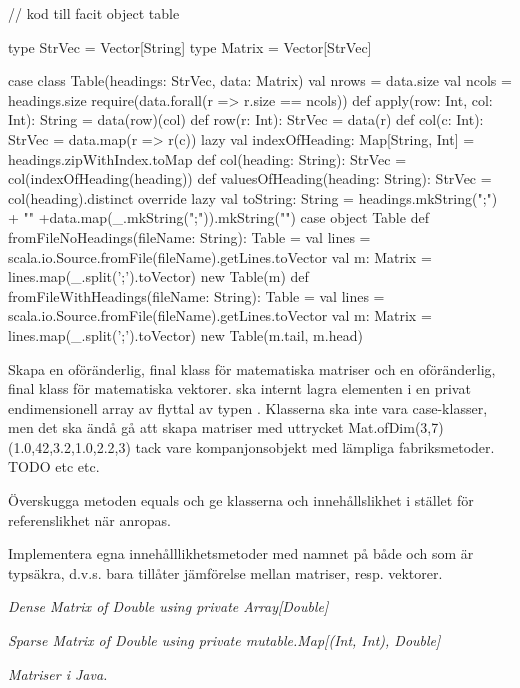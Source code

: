 \begin{CodeSmall}
// kod till facit
object table {
  type StrVec = Vector[String]
  type Matrix = Vector[StrVec]
  
  case class Table(headings: StrVec, data: Matrix){
    val nrows = data.size
    val ncols = headings.size
    require(data.forall(r => r.size == ncols))
    def apply(row: Int, col: Int): String = data(row)(col)
    def row(r: Int): StrVec = data(r)
    def col(c: Int): StrVec = data.map(r => r(c))
    lazy val indexOfHeading: Map[String, Int] = headings.zipWithIndex.toMap
    def col(heading: String): StrVec = col(indexOfHeading(heading)) 
    def valuesOfHeading(heading: String): StrVec = col(heading).distinct
    override lazy val toString: String = 
      headings.mkString(";") + "\n" +data.map(_.mkString(";")).mkString("\n")
  }
  case object Table {
    def fromFileNoHeadings(fileName: String): Table = {
      val lines = scala.io.Source.fromFile(fileName).getLines.toVector
      val m: Matrix  = lines.map(_.split(';').toVector) 
      new Table(m)
    }
    def fromFileWithHeadings(fileName: String): Table = {
      val lines = scala.io.Source.fromFile(fileName).getLines.toVector
      val m: Matrix  = lines.map(_.split(';').toVector) 
      new Table(m.tail, m.head)
    }
  }
}
\end{CodeSmall}


\Task Skapa en oföränderlig, final klass  för matematiska matriser och en oföränderlig, final klass  för matematiska vektorer.  ska internt lagra elementen i en privat endimensionell array av flyttal av typen . Klasserna ska inte vara case-klasser, men det ska ändå gå att skapa matriser med uttrycket Mat.ofDim(3,7)(1.0,42,3.2,1.0,2.2,3) tack vare  kompanjonsobjekt med lämpliga fabriksmetoder. TODO etc etc.

\Subtask Överskugga metoden equals och ge klasserna  och  innehållslikhet i stället för referenslikhet när \code{==} anropas.

\Subtask Implementera egna innehålllikhetsmetoder med namnet \code{===} på både  och  som är typsäkra, d.v.s. bara tillåter jämförelse mellan matriser, resp. vektorer.


\Task \emph{Dense Matrix of Double using private Array[Double]}


\Task \emph{Sparse Matrix of Double using private mutable.Map[(Int, Int), Double]}




\Task \emph{Matriser i Java.}





